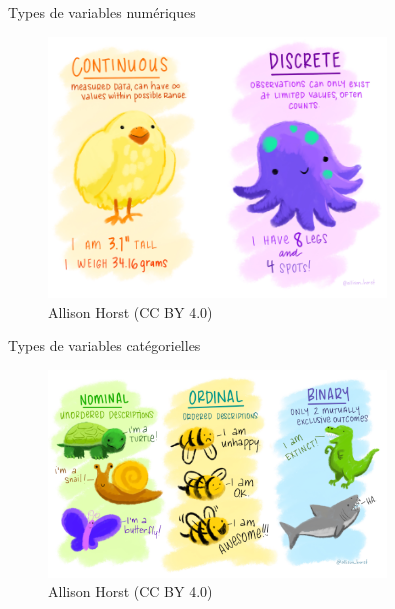 \documentclass[
  ignorenonframetext,
]{beamer}
\begin{document}
\begin{frame}{Types de variables numériques}
\protect\hypertarget{types-de-variables-numuxe9riques}{}
\begin{figure}

{\centering \includegraphics[width=0.8\textwidth,height=\textheight]{figures/continuous_discrete.png}

}

\caption{Allison Horst (CC BY 4.0)}

\end{figure}
\end{frame}

\begin{frame}{Types de variables catégorielles}
\protect\hypertarget{types-de-variables-catuxe9gorielles}{}
\begin{figure}

{\centering \includegraphics[width=0.8\textwidth,height=\textheight]{figures/nominal_ordinal_binary.png}

}

\caption{Allison Horst (CC BY 4.0)}

\end{figure}
\end{frame}
\end{document}
